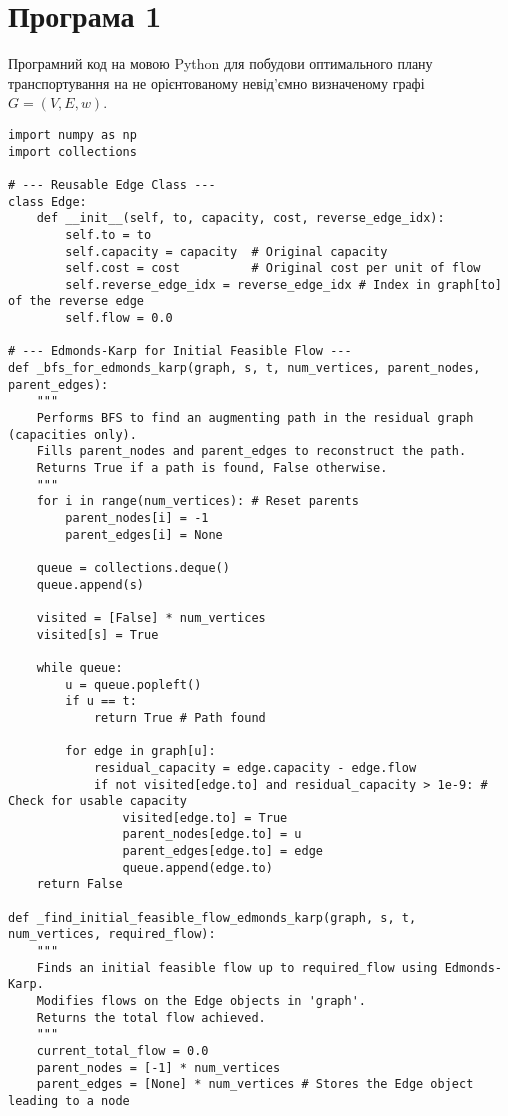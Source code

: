 \label{appendix:A}

\section{Програма 1}

Програмний код на мовою Python для побудови оптимального плану транспортування на 
не орієнтованому невід'ємно визначеному графі $G = (V, E, w)$.

\begin{verbatim}
import numpy as np
import collections

# --- Reusable Edge Class ---
class Edge:
    def __init__(self, to, capacity, cost, reverse_edge_idx):
        self.to = to
        self.capacity = capacity  # Original capacity
        self.cost = cost          # Original cost per unit of flow
        self.reverse_edge_idx = reverse_edge_idx # Index in graph[to] of the reverse edge
        self.flow = 0.0

# --- Edmonds-Karp for Initial Feasible Flow ---
def _bfs_for_edmonds_karp(graph, s, t, num_vertices, parent_nodes, parent_edges):
    """
    Performs BFS to find an augmenting path in the residual graph (capacities only).
    Fills parent_nodes and parent_edges to reconstruct the path.
    Returns True if a path is found, False otherwise.
    """
    for i in range(num_vertices): # Reset parents
        parent_nodes[i] = -1
        parent_edges[i] = None
    
    queue = collections.deque()
    queue.append(s)
    
    visited = [False] * num_vertices
    visited[s] = True

    while queue:
        u = queue.popleft()
        if u == t:
            return True # Path found

        for edge in graph[u]:
            residual_capacity = edge.capacity - edge.flow
            if not visited[edge.to] and residual_capacity > 1e-9: # Check for usable capacity
                visited[edge.to] = True
                parent_nodes[edge.to] = u
                parent_edges[edge.to] = edge
                queue.append(edge.to)
    return False

def _find_initial_feasible_flow_edmonds_karp(graph, s, t, num_vertices, required_flow):
    """
    Finds an initial feasible flow up to required_flow using Edmonds-Karp.
    Modifies flows on the Edge objects in 'graph'.
    Returns the total flow achieved.
    """
    current_total_flow = 0.0
    parent_nodes = [-1] * num_vertices
    parent_edges = [None] * num_vertices # Stores the Edge object leading to a node


\end{verbatim}
